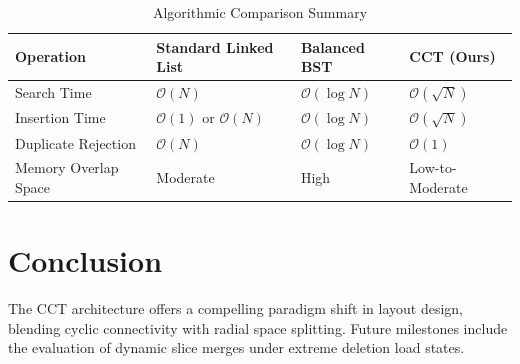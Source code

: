 \documentclass[11pt,a4paper]{article}
\begin{document}
\begin{table}[h]
\centering
\caption{Algorithmic Comparison Summary}
\begin{tabular}{llll}
\toprule
\textbf{Operation} & \textbf{Standard Linked List} & \textbf{Balanced BST} & \textbf{CCT (Ours)} \\
\midrule
Search Time & $\mathcal{O}(N)$ & $\mathcal{O}(\log N)$ & $\mathcal{O}(\sqrt{N})$ \\
Insertion Time & $\mathcal{O}(1)$ or $\mathcal{O}(N)$ & $\mathcal{O}(\log N)$ & $\mathcal{O}(\sqrt{N})$ \\
Duplicate Rejection & $\mathcal{O}(N)$ & $\mathcal{O}(\log N)$ & $\mathcal{O}(1)$ \\
Memory Overlap Space & Moderate & High & Low-to-Moderate \\
\bottomrule
\end{tabular}
\end{table}

\section{Conclusion}
The CCT architecture offers a compelling paradigm shift in layout design, blending cyclic connectivity with radial space splitting. Future milestones include the evaluation of dynamic slice merges under extreme deletion load states.
\end{document}
